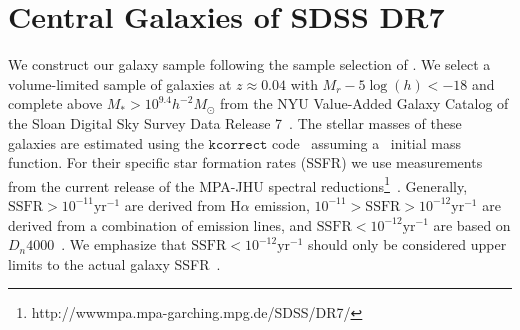 \documentclass[12pt, letterpaper, preprint, tighten]{aastex62}
\begin{document}
\section{Central Galaxies of SDSS DR7} \label{sec:sdss}
We construct our galaxy sample following the sample selection of \cite{tinker2011}.
We select a volume-limited sample of galaxies at $z \approx 0.04$ with
$M_r - 5 \log(h) < -18$ and complete above $M_* > 10^{9.4} h^{-2}M_\odot$ from
the NYU Value-Added Galaxy Catalog \citep[VAGC;][]{blanton2005} of the
Sloan Digital Sky Survey Data Release 7~\citep[SDSS DR7;][]{abazajian2009}.
The stellar masses of these galaxies are estimated using the
$\mathtt{kcorrect}$ code~\citep{blanton2007} assuming a~\cite{chabrier2003}
initial mass function. For their specific star formation rates (SSFR) we use
measurements from the current release of the MPA-JHU spectral
reductions\footnote{http://wwwmpa.mpa-garching.mpg.de/SDSS/DR7/}~\citep{brinchmann2004}.
Generally, $\mathrm{SSFR} > 10^{-11}\mathrm{yr}^{-1}$ are derived from
$\mathrm{H}\alpha$ emission, $10^{-11} > \mathrm{SSFR} > 10^{-12}\mathrm{yr}^{-1}$
are derived from a combination of emission lines, and $\mathrm{SSFR} < 10^{-12}\mathrm{yr}^{-1}$
are based on $D_n 4000$~\citep[see discussion in][]{wetzel2013}. We emphasize that
$\mathrm{SSFR} < 10^{-12}\mathrm{yr}^{-1}$ should only be considered upper limits
to the actual galaxy SSFR~\citep{salim2007}.
\end{document}
